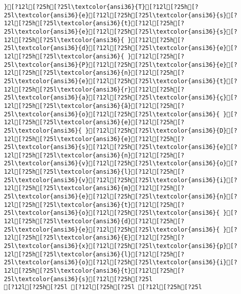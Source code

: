 \documentclass{scrartcl}
\begin{document}
\begin{Verbatim}
}[?12l[?25h[?25l\textcolor{ansi36}{T}[?12l[?25h[?25l\textcolor{ansi36}{e}[?12l[?25h[?25l\textcolor{ansi36}{s}[?12l[?25h[?25l\textcolor{ansi36}{t}[?12l[?25h[?25l\textcolor{ansi36}{e}[?12l[?25h[?25l\textcolor{ansi36}{s}[?12l[?25h[?25l\textcolor{ansi36}{ }[?12l[?25h[?25l\textcolor{ansi36}{d}[?12l[?25h[?25l\textcolor{ansi36}{e}[?12l[?25h[?25l\textcolor{ansi36}{ }[?12l[?25h[?25l\textcolor{ansi36}{P}[?12l[?25h[?25l\textcolor{ansi36}{e}[?12l[?25h[?25l\textcolor{ansi36}{n}[?12l[?25h[?25l\textcolor{ansi36}{e}[?12l[?25h[?25l\textcolor{ansi36}{t}[?12l[?25h[?25l\textcolor{ansi36}{r}[?12l[?25h[?25l\textcolor{ansi36}{a}[?12l[?25h[?25l\textcolor{ansi36}{ç}[?12l[?25h[?25l\textcolor{ansi36}{ã}[?12l[?25h[?25l\textcolor{ansi36}{o}[?12l[?25h[?25l\textcolor{ansi36}{ }[?12l[?25h[?25l\textcolor{ansi36}{e}[?12l[?25h[?25l\textcolor{ansi36}{ }[?12l[?25h[?25l\textcolor{ansi36}{D}[?12l[?25h[?25l\textcolor{ansi36}{e}[?12l[?25h[?25l\textcolor{ansi36}{s}[?12l[?25h[?25l\textcolor{ansi36}{e}[?12l[?25h[?25l\textcolor{ansi36}{n}[?12l[?25h[?25l\textcolor{ansi36}{v}[?12l[?25h[?25l\textcolor{ansi36}{o}[?12l[?25h[?25l\textcolor{ansi36}{l}[?12l[?25h[?25l\textcolor{ansi36}{v}[?12l[?25h[?25l\textcolor{ansi36}{i}[?12l[?25h[?25l\textcolor{ansi36}{m}[?12l[?25h[?25l\textcolor{ansi36}{e}[?12l[?25h[?25l\textcolor{ansi36}{n}[?12l[?25h[?25l\textcolor{ansi36}{t}[?12l[?25h[?25l\textcolor{ansi36}{o}[?12l[?25h[?25l\textcolor{ansi36}{ }[?12l[?25h[?25l\textcolor{ansi36}{d}[?12l[?25h[?25l\textcolor{ansi36}{e}[?12l[?25h[?25l\textcolor{ansi36}{ }[?12l[?25h[?25l\textcolor{ansi36}{E}[?12l[?25h[?25l\textcolor{ansi36}{x}[?12l[?25h[?25l\textcolor{ansi36}{p}[?12l[?25h[?25l\textcolor{ansi36}{l}[?12l[?25h[?25l\textcolor{ansi36}{o}[?12l[?25h[?25l\textcolor{ansi36}{i}[?12l[?25h[?25l\textcolor{ansi36}{t}[?12l[?25h[?25l\textcolor{ansi36}{s}[?12l[?25h[?25l
[?12l[?25h[?25l [?12l[?25h[?25l [?12l[?25h[?25l

\end{Verbatim}
\end{document}
